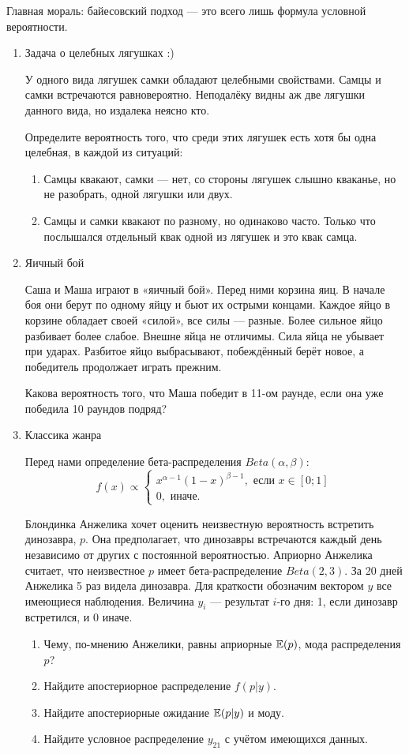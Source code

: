 Главная мораль: байесовский подход — это всего лишь формула условной вероятности.

\begin{enumerate}
\item Задача о целебных лягушках :)

У одного вида лягушек самки обладают целебными свойствами. Самцы и самки
встречаются равновероятно. Неподалёку видны аж две лягушки данного вида, но
издалека неясно кто.

Определите вероятность того, что среди этих лягушек есть хотя бы одна целебная,
в каждой из ситуаций:
\begin{enumerate}
\item Самцы квакают, самки — нет, со стороны лягушек слышно кваканье, но не разобрать,
одной лягушки или двух.
\item Самцы и самки квакают по разному, но одинаково часто. Только что послышался
отдельный квак одной из лягушек и это квак самца.
\end{enumerate}

\item Яичный бой

Саша и Маша играют в «яичный бой». Перед ними корзина яиц. В начале боя они берут
по одному яйцу и бьют их острыми концами. Каждое яйцо в корзине обладает своей «силой»,
все силы — разные. Более сильное яйцо разбивает более слабое. Внешне яйца не отличимы.
Сила яйца не убывает при ударах. Разбитое яйцо выбрасывают, побеждённый берёт новое,
а победитель продолжает играть прежним.

Какова вероятность того, что Маша победит в 11-ом раунде, если она уже победила
10 раундов подряд?

\item Классика жанра

Перед нами определение бета-распределения $Beta(\alpha, \beta)$:
\[
f(x) \propto \begin{cases}
x^{\alpha-1}(1-x)^{\beta-1}, \text{ если } x\in[0;1] \\
0, \text{ иначе.}
\end{cases}
\]

Блондинка Анжелика хочет оценить неизвестную вероятность встретить динозавра, $p$.
Она предполагает, что динозавры встречаются каждый день независимо от других с
постоянной вероятностью. Априорно Анжелика считает, что неизвестное $p$ имеет
бета-распределение $Beta(2, 3)$. За 20 дней Анжелика 5 раз видела динозавра.
Для краткости обозначим вектором $y$ все имеющиеся наблюдения. Величина $y_i$ —
результат $i$-го дня: 1, если динозавр встретился, и 0 иначе.
\begin{enumerate}
\item Чему, по-мнению Анжелики, равны априорные $\operatorname{\mathbb{E}}(p)$, мода распределения $p$?
\item Найдите апостериорное распределение $f(p|y)$.
\item Найдите апостериорные ожидание $\operatorname{\mathbb{E}}(p|y)$ и моду.
\item Найдите условное распределение $y_{21}$ с учётом имеющихся данных.
\end{enumerate}


\end{enumerate}
